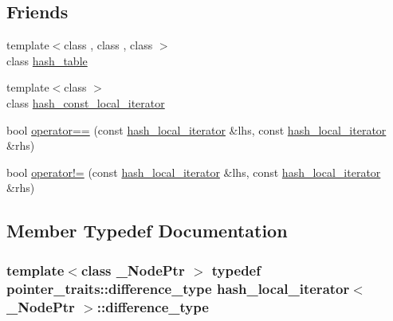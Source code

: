 \subsection*{Friends}
\begin{DoxyCompactItemize}
\item 
{\footnotesize template$<$class , class , class $>$ }\\class \hyperlink{classhash__local__iterator_a39f140c37d8ec7b0c08b23083c94562e}{hash\+\_\+table}
\item 
{\footnotesize template$<$class $>$ }\\class \hyperlink{classhash__local__iterator_adb65189c874e6ca21e80987d1cda696a}{hash\+\_\+const\+\_\+local\+\_\+iterator}
\item 
bool \hyperlink{classhash__local__iterator_a782c403295d166dc14d2350772adf50b}{operator==} (const \hyperlink{classhash__local__iterator}{hash\+\_\+local\+\_\+iterator} \&lhs, const \hyperlink{classhash__local__iterator}{hash\+\_\+local\+\_\+iterator} \&rhs)
\item 
bool \hyperlink{classhash__local__iterator_a59dc2e0a3828f0cb29ce36ef3b3d27dd}{operator!=} (const \hyperlink{classhash__local__iterator}{hash\+\_\+local\+\_\+iterator} \&lhs, const \hyperlink{classhash__local__iterator}{hash\+\_\+local\+\_\+iterator} \&rhs)
\end{DoxyCompactItemize}


\subsection{Member Typedef Documentation}
\hypertarget{classhash__local__iterator_a72aeabbbbe66592d0d7321c0df5e6d1d}{}
\subsubsection[{difference\+\_\+type}]{\setlength{\rightskip}{0pt plus 5cm}template$<$class \+\_\+\+Node\+Ptr $>$ typedef pointer\+\_\+traits\+::difference\+\_\+type {\bf hash\+\_\+local\+\_\+iterator}$<$ \+\_\+\+Node\+Ptr $>$\+::{\bf difference\+\_\+type}}\label{classhash__local__iterator_a72aeabbbbe66592d0d7321c0df5e6d1d}
\hypertarget{classhash__local__iterator_a317e8344fdb30a1260fcb6acbc6a4148}{}
